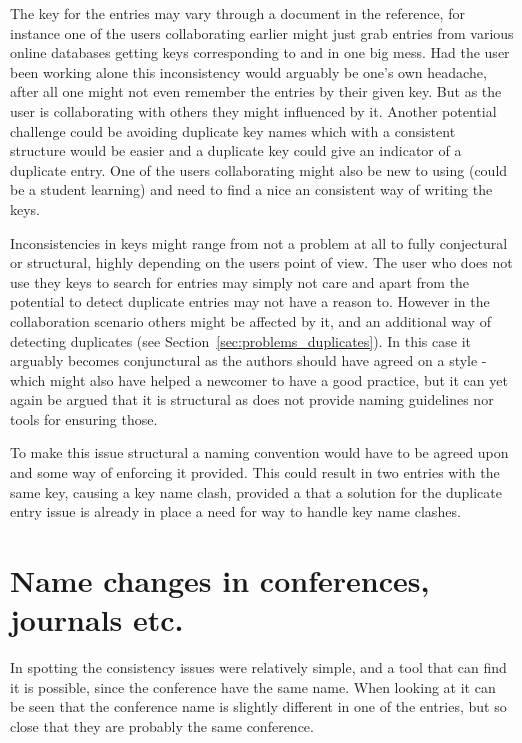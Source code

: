 The key for the entries may vary through a document in the reference,
for instance one of the users collaborating earlier might just grab
entries from various online databases getting keys corresponding to
 and 
in one big mess.  Had the user been working alone this inconsistency
would arguably be one's own headache, after all one might not even
remember the entries by their given key. But as the user is
collaborating with others they might influenced by it.  Another
potential challenge could be avoiding duplicate key names which with a
consistent structure would be easier and a duplicate key could give an
indicator of a duplicate entry.  One of the users collaborating might
also be new to using {\bibtex} (could be a student learning) and need
to find a nice an consistent way of writing the keys.

Inconsistencies in keys might range from not a problem at all to fully
conjectural or structural, highly depending on the users point of
view.  The user who does not use they keys to search for entries may
simply not care and apart from the potential to detect duplicate
entries may not have a reason to.  However in the collaboration
scenario others might be affected by it, and an additional way of
detecting duplicates (see Section~\ref{sec:problems_duplicates}).  In
this case it arguably becomes conjunctural as the authors should have
agreed on a style - which might also have helped a newcomer to have a
good practice, but it can yet again be argued that it is structural as
{\bibtex} does not provide naming guidelines nor tools for ensuring
those.

To make this issue structural a naming convention would have to be
agreed upon and some way of enforcing it provided.  This could result
in two entries with the same key, causing a key name clash, provided
a that a solution for the duplicate entry issue is already in place a
need for way to handle key name clashes.


\section{Name changes in conferences, journals etc.}
\label{sec:problems_name_changes}

In  spotting the
consistency issues were relatively simple, and a tool that can find it
is possible, since the conference have the same name.  When looking at
 it can be seen that the
conference name is slightly different in one of the entries, but so
close that they are probably the same conference.

